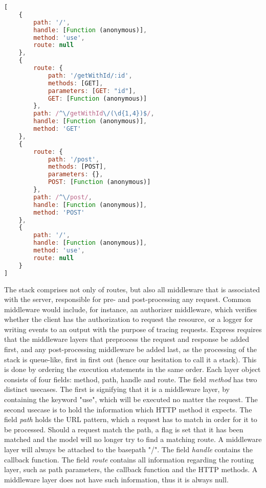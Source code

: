\begin{lstlisting}[language=JavaScript, label={lst:stack-example}, float,
	caption={The routing stack created by the express model.}]
[
    {
        path: '/',
        handle: [Function (anonymous)],
        method: 'use',
        route: null
    },
    {
        route: {
            path: '/getWithId/:id',
            methods: [GET],
            parameters: [GET: "id"],
            GET: [Function (anonymous)]
        },
        path: /^\/getWithId\/(\d{1,4})$/,
        handle: [Function (anonymous)],
        method: 'GET'
    },
    {
        route: {
            path: '/post',
            methods: [POST],
            parameters: {},
            POST: [Function (anonymous)]
        },
        path: /^\/post/,
        handle: [Function (anonymous)],
        method: 'POST'
    },
    {
        path: '/',
        handle: [Function (anonymous)],
        method: 'use',
        route: null
    }
]
\end{lstlisting}

The stack comprises not only of routes, but also all middleware that is associated with the server, responsible for pre- and post-processing any request. Common middleware would include, for instance, an authorizer middleware, which verifies whether the client has the authorization to request the resource, or a logger for writing events to an output with the purpose of tracing requests.
Express requires that the middleware layers that preprocess the request and response be added first, and any post-processing middleware be added last, as the processing of the stack is queue-like, first in first out (hence our hesitation to call it a stack). This is done by ordering the execution statements in the same order.
Each layer object consists of four fields: method, path, handle and route.
The field \textit{method} has two distinct usecases. The first is signifying that it is a middleware layer, by containing the keyword "use", which will be executed no matter the request.
The second usecase is to hold the information which HTTP method it expects. 
The field \textit{path} holds the URL pattern, which a request has to match in order for it to be processed. Should a request match the path, a flag is set that it has been matched and the model will no longer try to find a matching route. A middleware layer will always be attached to the basepath "/".
The field \textit{handle} contains the callback function.
The field \textit{route} contains all information regarding the routing layer, such as path parameters, the callback function and the HTTP methods. A middleware layer does not have such information, thus it is always null.


